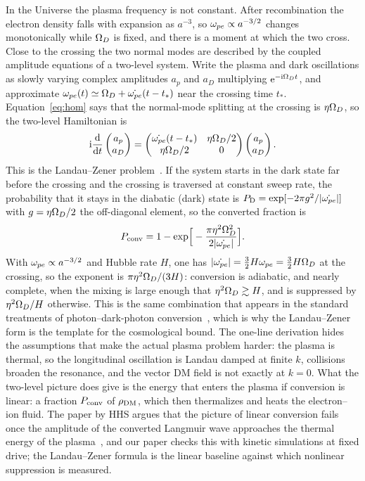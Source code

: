 In the Universe the plasma frequency is not constant. After recombination the electron density falls with expansion as $a^{-3}$, so $\omega_{pe}\propto a^{-3/2}$ changes monotonically while $\Omega_D$ is fixed, and there is a moment at which the two cross. Close to the crossing the two normal modes are described by the coupled amplitude equations of a two-level system. Write the plasma and dark oscillations as slowly varying complex amplitudes $a_p$ and $a_D$ multiplying $\mathrm{e}^{-\mathrm{i}\Omega_D t}$, and approximate $\omega_{pe}(t)\simeq\Omega_D+\dot{\omega_{pe}}(t-t_*)$ near the crossing time $t_*$. Equation~\eqref{eq:hom} says that the normal-mode splitting at the crossing is $\eta\Omega_D$, so the two-level Hamiltonian is
\begin{equation}
\mathrm{i}\frac{\mathrm{d}}{\mathrm{d} t}\begin{pmatrix}a_p\\a_D\end{pmatrix}=\begin{pmatrix}\dot{\omega_{pe}}(t-t_*)&\eta\Omega_D/2\\ \eta\Omega_D/2&0\end{pmatrix}\begin{pmatrix}a_p\\a_D\end{pmatrix} .
\end{equation}
This is the Landau--Zener problem~\citep{Landau1932,Zener1932}. If the system starts in the dark state far before the crossing and the crossing is traversed at constant sweep rate, the probability that it stays in the diabatic (dark) state is $P_{\rm D}=\exp[-2\pi g^2/|\dot{\omega_{pe}}|]$ with $g=\eta\Omega_D/2$ the off-diagonal element, so the converted fraction is
\begin{equation}
P_{\rm conv}=1-\exp\!\Big[-\frac{\pi\eta^2\Omega_D^2}{2|\dot{\omega_{pe}}|}\Big] .\label{eq:LZ}
\end{equation}
With $\omega_{pe}\propto a^{-3/2}$ and Hubble rate $H$, one has $|\dot{\omega_{pe}}|=\tfrac32H\omega_{pe}=\tfrac32H\Omega_D$ at the crossing, so the exponent is $\pi\eta^2\Omega_D/(3H)$: conversion is adiabatic, and nearly complete, when the mixing is large enough that $\eta^2\Omega_D\gtrsim H$, and is suppressed by $\eta^2\Omega_D/H$ otherwise. This is the same combination that appears in the standard treatments of photon--dark-photon conversion~\citep{Mirizzi2009,DubovskyHC2015}, which is why the Landau--Zener form is the template for the cosmological bound. The one-line derivation hides the assumptions that make the actual plasma problem harder: the plasma is thermal, so the longitudinal oscillation is Landau damped at finite $k$, collisions broaden the resonance, and the vector DM field is not exactly at $k=0$. What the two-level picture does give is the energy that enters the plasma if conversion is linear: a fraction $P_{\rm conv}$ of $\rho_{\rm DM}$, which then thermalizes and heats the electron--ion fluid. The paper by HHS argues that the picture of linear conversion fails once the amplitude of the converted Langmuir wave approaches the thermal energy of the plasma~\citep{HHS2026}, and our paper checks this with kinetic simulations at fixed drive; the Landau--Zener formula is the linear baseline against which nonlinear suppression is measured.

